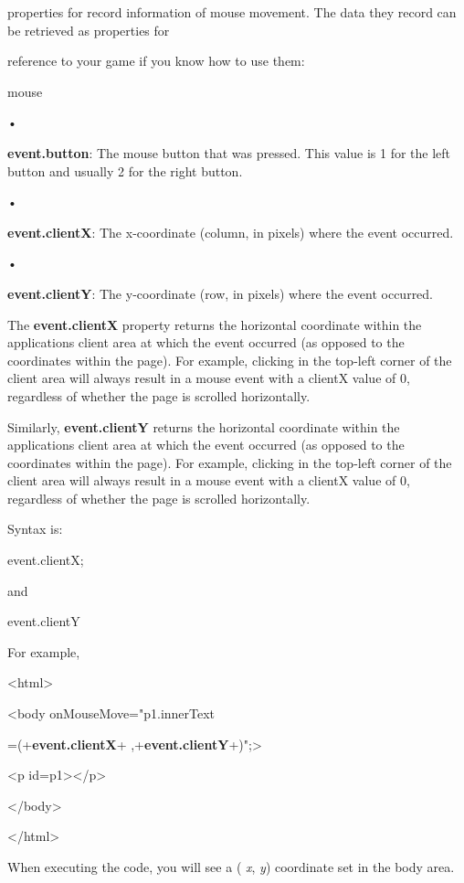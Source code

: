 \documentclass[
]{article}
\begin{document}
properties for record information of mouse movement. The data they
record can be retrieved as properties for

reference to your game if you know how to use them:

mouse

•

\textbf{event.button}: The mouse button that was pressed. This value is
1 for the left button and usually 2 for the right button.

•

\textbf{event.clientX}: The x-coordinate (column, in pixels) where the
event occurred.

•

\textbf{event.clientY}: The y-coordinate (row, in pixels) where the
event occurred.

The \textbf{event.clientX} property returns the horizontal coordinate
within the application\textquotesingle s client area at which the event
occurred (as opposed to the coordinates within the page). For example,
clicking in the top-left corner of the client area will always result in
a mouse event with a clientX value of 0, regardless of whether the page
is scrolled horizontally.

Similarly, \textbf{event.clientY} returns the horizontal coordinate
within the application\textquotesingle s client area at which the event
occurred (as opposed to the coordinates within the page). For example,
clicking in the top-left corner of the client area will always result in
a mouse event with a clientX value of 0, regardless of whether the page
is scrolled horizontally.

Syntax is:

event.clientX;

and

event.clientY

For example,

\textless html\textgreater{}

\textless body onMouseMove="p1.innerText

=\textquotesingle(\textquotesingle+\textbf{event.clientX}+\textquotesingle{}
,\textquotesingle+\textbf{event.clientY}+\textquotesingle)\textquotesingle";\textgreater{}

\textless p id=p1\textgreater\textless/p\textgreater{}

\textless/body\textgreater{}

\textless/html\textgreater{}

When executing the code, you will see a ( \emph{x}, \emph{y}) coordinate
set in the body area.
\end{document}
